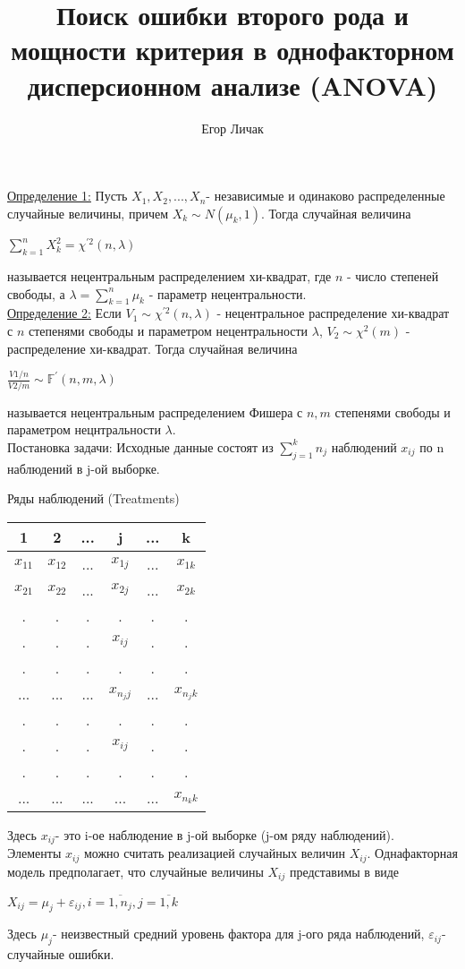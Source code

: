 \documentclass[a4paper]{article}
\title{Поиск ошибки второго рода и мощности критерия в однофакторном дисперсионном анализе (ANOVA)}
\author{Егор Личак}
\begin{document}
\maketitle
\underline{Определение 1:} Пусть $X_1, X_2,...,X_n$- независимые и одинаково распределенные случайные величины, причем $X_k \sim N(\mu_k, 1)$. Тогда случайная величина
\begin{center}
    $\sum\limits_{k = 1}^{n} X_k^2 = \chi^{'2}(n, \lambda)$
\end{center}
называется нецентральным распределением хи-квадрат, где $n$ - число степеней свободы, а $\lambda = \sum\limits_{k = 1}^{n}\mu_k$ - параметр нецентральности.\\
\underline{Определение 2:} Если $V_1 \sim \chi^{'2}(n, \lambda)$ - нецентральное распределение хи-квадрат с $n$ степенями свободы и параметром нецентральности $\lambda$, $V_2 \sim \chi^2(m)$ - распределение хи-квадрат. Тогда случайная величина
\begin{center}
    $\frac{V1/n}{V2/m} \sim \mathbb{F}^{'}(n, m, \lambda)$
\end{center}
называется нецентральным распределением Фишера с $n, m$ степенями свободы и параметром нецнтральности $\lambda$.\\
Постановка задачи: Исходные данные состоят из $\sum\limits_{j = 1}^{k}n_j$ наблюдений $x_{ij}$ по n наблюдений в j-ой выборке.
\begin{center}
Ряды наблюдений (Treatments)\\
\begin{tabular}{ |  c  |   c   |   c   |   c   |   c   |   c   |} 
 \hline
 1 & 2 & ... & j & ... & k\\
 \hline
 $x_{11}$ & $x_{12}$ & ... &$x_{1j}$ & ... &$x_{1k}$\\
 \hline
 $x_{21}$ & $x_{22}$ & ... &$x_{2j}$ & ... &$x_{2k}$\\
 \hline
 . & .& . & . & . &.\\
 . & .& . &$x_{ij}$ & . &.\\
 . & .& . & . & . &.\\
 \hline
 ... & ... & ... &$x_{n_{j}j}$ & ... &$x_{n_{j}k}$\\
 \hline
 . & .& . & . & . &.\\
 . & .& . &$x_{ij}$ & . &.\\
 . & .& . & . & . &.\\
 \hline
 ... & ... & ... &... & ... &$x_{n_{k}k}$\\
 \hline
\end{tabular}
\end{center}
Здесь $x_{ij}$- это i-ое наблюдение в j-ой выборке (j-ом ряду наблюдений).\\
Элементы $x_{ij}$ можно считать реализацией случайных величин $X_{ij}$. Однафакторная модель предполагает, что случайные величины $X_{ij}$ представимы в виде 
\begin{center}
    $X_{ij} = \mu_j + \varepsilon_{ij}, i = \overline{1,n_j}, j = \overline{1, k}$
\end{center}
Здесь $\mu_j$- неизвестный средний уровень фактора для j-ого ряда наблюдений, $\varepsilon_{ij}$- случайные ошибки.
\end{document}
